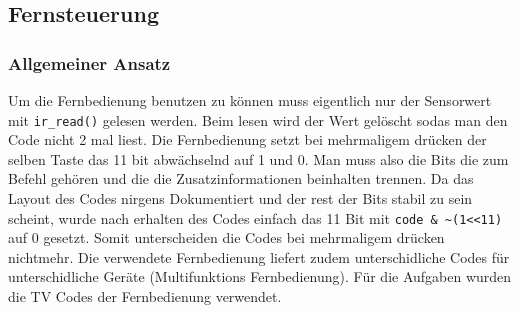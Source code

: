 \subsection{Fernsteuerung}
\label{fernsteuerung}

\subsubsection{Allgemeiner Ansatz}

Um die Fernbedienung benutzen zu können muss eigentlich nur der Sensorwert mit \verb|ir_read()| gelesen werden. Beim lesen wird der Wert gelöscht sodas man den Code nicht 2 mal liest. Die Fernbedienung setzt bei mehrmaligem drücken der selben Taste das 11 bit abwächselnd auf 1 und 0. Man muss also die Bits die zum Befehl gehören und die die Zusatzinformationen beinhalten trennen. Da das Layout des Codes nirgens Dokumentiert und der rest der Bits stabil zu sein scheint, wurde nach erhalten des Codes einfach das 11 Bit mit \verb|code & ~(1<<11)| auf 0 gesetzt. Somit unterscheiden die Codes bei mehrmaligem drücken nichtmehr. Die verwendete Fernbedienung liefert zudem unterschidliche Codes für unterschidliche Geräte (Multifunktions Fernbedienung). Für die Aufgaben wurden die TV Codes der Fernbedienung verwendet.

